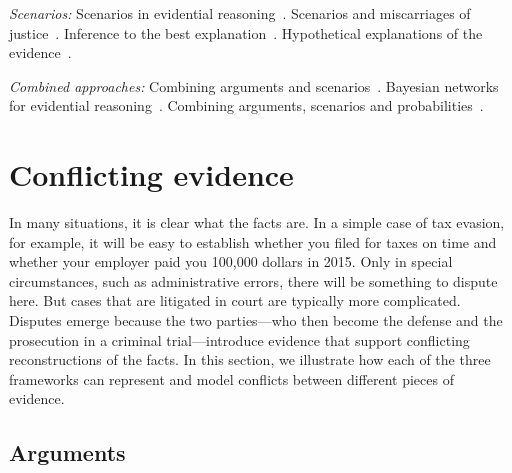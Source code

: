 \documentclass[10pt]{article}
\begin{document}
\textit{Scenarios:}
Scenarios in evidential reasoning~\citep{bennettFeldman1981,penningtonHastie1993,penningtonHastie1993StoryModel}. Scenarios and miscarriages of justice~\citep{wagenaarEtal1993}. Inference to the best explanation~\citep{pardoAllen2008}. Hypothetical explanations of the evidence~\citep{thagard1989}. 


\textit{Combined approaches:}
Combining arguments and scenarios~\citep{bexEtal2010,bex2011}. Bayesian networks for evidential reasoning~\citep{heplerEtal2007,fentonNeilLagnado2013}. Combining arguments, scenarios and probabilities~\citep{vlekEtal2014, timmerEtAl2015ecsqaru, verheijEtal2016,verheij2014}.  

\section{Conflicting evidence}
\label{sec:conf}
 	

In many situations, it is clear what the facts are. In a simple case of tax evasion, for example, 
it will be easy to establish whether you filed for taxes on time and whether your employer paid you 100,000 dollars in 2015. Only in special circumstances, 
such as administrative errors, there will be something to dispute here. 
But cases that are litigated in court are typically more complicated.
Disputes emerge because the two parties---who then become the defense and the 
prosecution in a criminal trial---introduce evidence that support conflicting 
reconstructions of the facts. In this section, we illustrate how 
each of the three frameworks can represent and model conflicts 
between different pieces of evidence. 





\subsection{Arguments}
\label{sec:confArg}
\end{document}
